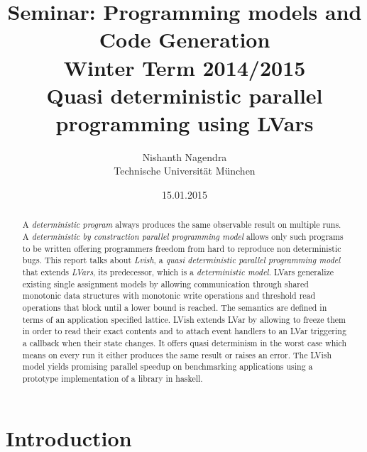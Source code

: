 \documentclass[twocolumn]{article}
\author{Nishanth Nagendra \\ Technische Universit\"at M\"unchen}
\title{Seminar: Programming models and Code Generation\\
       Winter Term 2014/2015\\
       {\bf Quasi deterministic parallel programming using LVars}
}
\date{15.01.2015}
\begin{document}
\maketitle

\begin{abstract}
A \textit{deterministic program} always produces the same observable result on multiple runs. A \textit{deterministic by construction parallel programming model} allows only such programs to be written offering programmers freedom from hard to reproduce non deterministic bugs. This report talks about \textit{Lvish}, a \textit{quasi deterministic parallel programming model} that extends \textit{LVars}, its predecessor, which is a \textit{deterministic model}. LVars generalize existing single assignment models by allowing communication through shared monotonic data structures with monotonic write operations and threshold read operations that block until a lower bound is reached. The semantics are defined in terms of an application specified lattice. LVish extends LVar by allowing to freeze them in order to read their exact contents and to attach event handlers to an LVar triggering a callback when their state changes. It offers quasi determinism in the worst case which means on every run it either produces the same result or raises an error. The LVish model yields promising parallel speedup on benchmarking applications using a prototype implementation of a library in haskell.
\end{abstract}

\section{Introduction}

\label{introduction}
\end{document}
